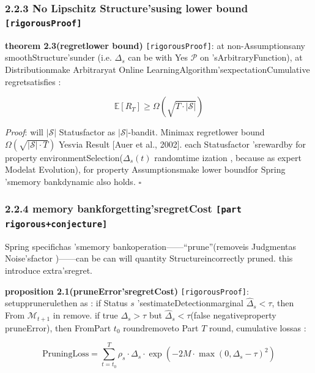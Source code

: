 \documentclass[
  12pt,
]{article}
\begin{document}
\subsubsection{\texorpdfstring{2.2.3 No Lipschitz Structure'susing lower bound
\texttt{{[}rigorousProof{]}}}{2.2.3 No Lipschitz Structure'susing lower bound {[}rigorousProof{]}}}\label{ux65e0-lipschitz-ux7ed3ux6784ux7684ux901aux7528ux4e0bux754c-ux4e25ux683cux8bc1ux660e}

\textbf{theorem  2.3(regretlower bound)}
\texttt{{[}rigorousProof{]}}: at non-Assumptionsany smoothStructure'sunder (i.e. \(\Delta_s\)
can be with Yes \(\mathcal{P}\)
on 'sArbitraryFunction), at Distributionmake Arbitraryat Online LearningAlgorithm'sexpectationCumulative regretsatisfies : 

\[\boxed{\mathbb{E}[R_T] \geq \Omega\left(\sqrt{T \cdot |\mathcal{S}|}\right)}\]

\emph{Proof}: will  \(|\mathcal{S}|\) Statusfactor as 
\(|\mathcal{S}|\)-bandit. Minimax regretlower bound
\(\Omega(\sqrt{|\mathcal{S}| \cdot T})\) Yesvia Result {[}Auer et al.,
2002{]}. each Statusfactor 'srewardby for property environmentSelection(\(\Delta_s(t)\)
randomtime ization , because as expert Modelat Evolution), for property Assumptionsmake lower boundfor  Spring
'smemory bankdynamic also holds. \(\square\)

\subsubsection{\texorpdfstring{2.2.4 memory bankforgetting'sregretCost
\texttt{{[}part rigorous+conjecture{]}}}{2.2.4 memory bankforgetting'sregretCost {[}part rigorous+conjecture{]}}}\label{ux8bb0ux5fc6ux5e93ux9057ux5fd8ux7684ux9057ux61beux4ee3ux4ef7-ux90e8ux5206ux4e25ux683cux731cux60f3}

Spring
specifichas 'smemory bankoperation------``prune''(removeis Judgmentas Noise'sfactor )------can be can will quantity Structureincorrectly pruned. this introduce extra'sregret. 

\textbf{proposition 2.1(pruneError'sregretCost)}
\texttt{{[}rigorousProof{]}}: setupprunerulethen as : if Status \(s\) 'sestimateDetectionmarginal
\(\hat{\Delta}_s < \tau\), then From \(\mathcal{M}_{t+1}\) in remove. if true
\(\Delta_s > \tau\) but 
\(\hat{\Delta}_s < \tau\)(false negativeproperty pruneError), then FromPart \(t_0\) roundremoveto Part
\(T\) round, cumulative lossas : 

\[\boxed{\text{PruningLoss} = \sum_{t=t_0}^{T} \rho_s \cdot \Delta_s \cdot \exp\left(-2M \cdot \max(0, \Delta_s - \tau)^2\right)}\]
\end{document}
